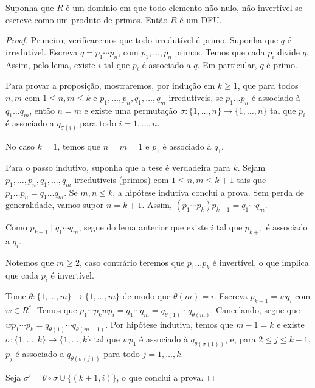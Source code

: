 \begin{prop}
Suponha que $R$ é um domínio em que todo elemento não nulo, não invertível se escreve como um produto de primos.
Então $R$ é um DFU.
\end{prop}
\begin{proof}
    Primeiro, verificaremos que todo irredutível é primo.
    Suponha que $q$ é irredutível.
    Escreva $q=p_1\cdots p_n$, com $p_1, \dots, p_n$ primos.
    Temos que cada $p_i$ divide $q$.
    Assim, pelo lema, existe $i$ tal que $p_i$ é associado a $q$.
    Em particular, $q$ é primo.


    Para provar a proposição, mostraremos, por indução em $k\geq 1$, que para todos $n, m$ com $1\leq n, m\leq k$ e $p_1, \dots, p_n, q_1, \dots, q_m$  irredutíveis, se $p_1\dots p_n$ é associado à $q_1\dots q_m$, então $n=m$ e existe uma permutação $\sigma:\{1, \dots, n\}\rightarrow \{1, \dots, n\}$ tal que $p_i$ é associado a $q_{\sigma(i)}$ para todo $i=1, \dots, n$.

    No caso $k=1$, temos que $n=m=1$ e $p_1$ é associado à $q_1$.

    Para o passo indutivo, suponha que a tese é verdadeira para $k$. Sejam $p_1, \dots, p_{n}, q_1, \dots, q_{m}$ irredutíveis (primos) com $1\leq n, m\leq k+1$ tais que $p_1\dots p_{n}=q_1\dots q_{m}$.
    Se $m, n\leq k$, a hipótese indutiva conclui a prova.
    Sem perda de generalidade, vamos supor $n=k+1$.
    Assim, $(p_1\cdots p_{k})p_{k+1}=q_1\cdots q_{m}$.

    Como $p_{k+1}\mid q_1\cdots q_m$, segue do lema anterior que existe $i$ tal que $p_{k+1}$ é associado a $q_i$.

    Notemos que $m\geq 2$, caso contrário teremos que $p_1\dots p_k$ é invertível, o que implica que cada $p_i$ é invertível.

    Tome $\theta: \{1, \dots, m\}\rightarrow \{1, \dots, m\}$ de modo que  $\theta(m)=i$. Escreva $p_{k+1}=w q_i$ com $w \in R^*$.
    Temos que $p_1\cdots p_{k}w p_i=q_1\cdots q_{m}=q_{\theta(1)}\cdots q_{\theta(m)}$.
    Cancelando, segue que $wp_1\cdots p_{k}=q_{\theta(1)}\cdots q_{\theta(m-1)}$.
    Por hipótese indutiva, temos que $m-1=k$ e existe $\sigma: \{1, \dots, k\}\rightarrow \{1, \dots, k\}$ tal que $wp_1$ é associado à $q_{\theta(\sigma(1))}$, e, para $2\leq j\leq k-1$, $p_j$ é associado a $q_{\theta(\sigma(j))}$ para todo $j=1, \dots, k$.

    Seja $\sigma'=\theta\circ\sigma \cup \{(k+1, i)\}$, o que conclui a prova.
\end{proof}

